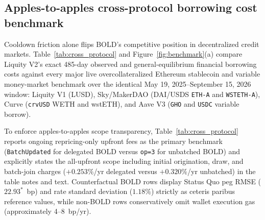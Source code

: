 \subsection{Apples-to-apples cross-protocol borrowing cost benchmark}\label{subsec:cross_protocol}

Cooldown friction alone flips BOLD's competitive position in decentralized credit markets. Table~\ref{tab:cross_protocol} and Figure~\ref{fig:benchmark}(a) compare Liquity V2's exact 485-day observed and general-equilibrium financial borrowing costs against every major live overcollateralized Ethereum stablecoin and variable money-market benchmark over the identical May 19, 2025--September 15, 2026 window: Liquity V1 (LUSD), Sky/MakerDAO (DAI/USDS \texttt{ETH-A} and \texttt{WSTETH-A}), Curve (\texttt{crvUSD} WETH and wstETH), and Aave V3 (\texttt{GHO} and \texttt{USDC} variable borrow).

To enforce apples-to-apples scope transparency, Table~\ref{tab:cross_protocol} reports ongoing repricing-only upfront fees as the primary benchmark (\texttt{BatchUpdated} for delegated BOLD versus \texttt{op=3} for unbatched BOLD) and explicitly states the all-upfront scope including initial origination, draw, and batch-join charges ($+0.253\%$/yr delegated versus $+0.320\%$/yr unbatched) in the table notes and text. Counterfactual BOLD rows display Status Quo peg RMSE ($22.93^*$~bp) and rate standard deviation ($1.18\%$) strictly as ceteris paribus reference values, while non-BOLD rows conservatively omit wallet execution gas (approximately 4--8~bp/yr).

